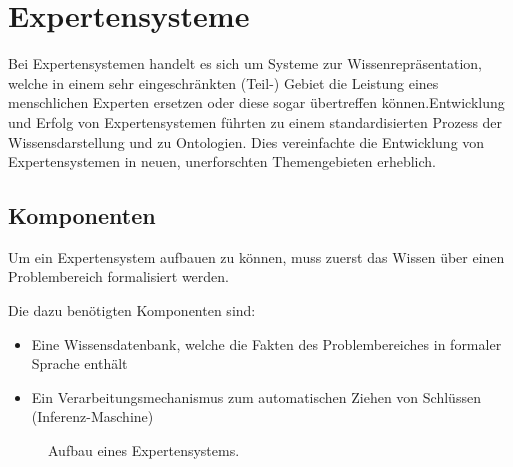 \chapter{Expertensysteme}
\label{chap:experten_systeme}

Bei Expertensystemen handelt es sich um Systeme zur Wissenrepräsentation, welche in einem sehr eingeschränkten (Teil-) Gebiet die Leistung eines menschlichen Experten ersetzen  oder diese sogar übertreffen können.Entwicklung und Erfolg von Expertensystemen führten zu einem standardisierten Prozess der Wissensdarstellung und zu Ontologien. Dies vereinfachte die Entwicklung von Expertensystemen in neuen, unerforschten Themengebieten erheblich.~\cite[S. 257]{russel}

\section{Komponenten}
\label{sec:experten_systeme_komponenten}
Um ein Expertensystem aufbauen zu können, muss zuerst das Wissen über einen Problembereich formalisiert werden.~\cite[S. 23]{laemmel}

Die dazu benötigten Komponenten sind:
\begin{itemize}
    \item Eine Wissensdatenbank, welche die Fakten des Problembereiches in formaler Sprache enthält
    \item Ein Verarbeitungsmechanismus zum automatischen Ziehen von Schlüssen (Inferenz-Maschine)
\end{itemize}

\begin{figure}[htbp]
\centering {}
\caption{Aufbau eines Expertensystems.\label{fig:aufbau_expertensysteme}\protect\footnotemark}
\end{figure}

